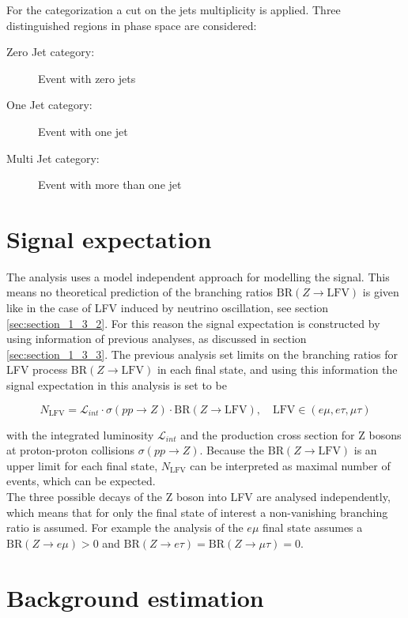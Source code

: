 For the categorization a cut on the jets multiplicity is applied. Three distinguished regions in phase space are considered:

\begin{description}
	\item [Zero Jet category:] Event with zero jets
	\item [One Jet category:] Event with one jet
	\item [Multi Jet category:] Event with more than one jet
\end{description}


\section{Signal expectation}
\label{sec:section_3_3}

The analysis uses a model independent approach for modelling the signal. This means no theoretical prediction of the branching ratios $\text{BR}(Z\to\text{LFV})$ is given like in the case of \gls{LFV} induced by neutrino oscillation, see section \ref{sec:section_1_3_2}. For this reason the signal expectation is constructed by using information of previous analyses, as discussed in section \ref{sec:section_1_3_3}. The previous analysis set limits on the branching ratios for \gls{LFV} process $\text{BR}(Z\to\text{LFV})$ in each final state, and using this information the signal expectation in this analysis is  set to be

\begin{equation}
	\label{eq:eq_3_3}
	N_{\text{LFV}} = \mathcal{L}_{int} \cdot \sigma(pp\to Z) \cdot \text{BR}(Z\to\text{LFV}), \quad \text{LFV} \in (e\mu, e\tau, \mu\tau)
\end{equation}

with the integrated luminosity $\mathcal{L}_{int}$ and the production cross section for Z bosons at proton-proton collisions $\sigma(pp\to Z)$. Because the $\text{BR}(Z\to\text{LFV})$ is an upper limit for each final state, $N_{\text{LFV}}$ can be interpreted as maximal number of events, which can be expected. \\

The three possible decays of the Z boson into \gls{LFV} are analysed independently, which means that for only the final state of interest a non-vanishing branching ratio is assumed. For example the analysis of the $e\mu$ final state assumes a $\text{BR}(Z\to e\mu) > 0$ and  $\text{BR}(Z\to e\tau) = \text{BR}(Z\to \mu\tau) = 0$. 


\section{Background estimation}

